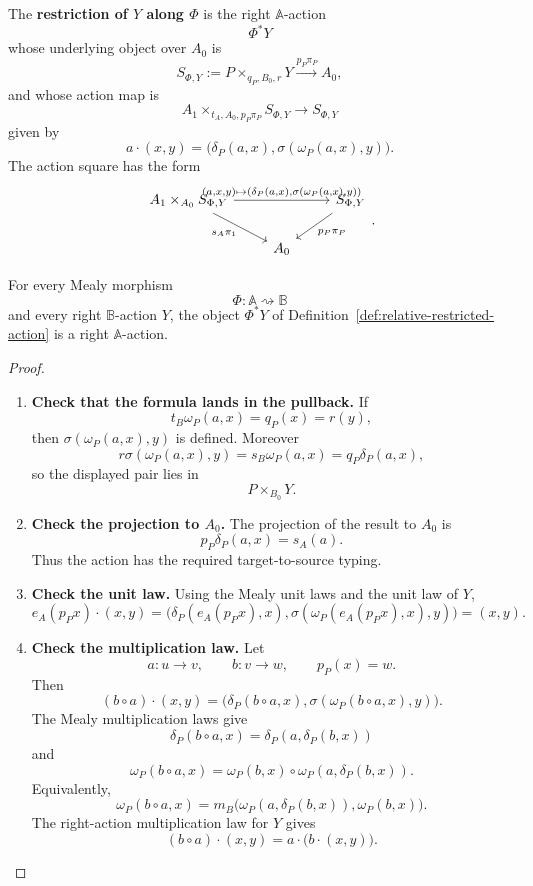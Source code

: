 \begin{definition}
\label{def:relative-restricted-action}
The \textbf{restriction of \(Y\) along \(\Phi\)} is the right
\(\mathbb A\)-action
\[
\Phi^\ast Y
\]
whose underlying object over \(A_0\) is
\[
S_{\Phi,Y}:=
P\times_{q_P,B_0,r}Y
\xrightarrow{p_P\pi_P}
A_0,
\]
and whose action map is
\[
A_1\times_{t_A,A_0,p_P\pi_P}S_{\Phi,Y}
\to S_{\Phi,Y}
\]
given by
\[
a\cdot(x,y)
=
\bigl(
\delta_P(a,x),
\sigma(\omega_P(a,x),y)
\bigr).
\]
The action square has the form
\[
\begin{tikzcd}
A_1\times_{A_0}S_{\Phi,Y}
\arrow[rr,"{(a,x,y)\mapsto(\delta_P(a,x),\sigma(\omega_P(a,x),y))}"]
\arrow[dr,"s_A\pi_1"']
&&
S_{\Phi,Y}
\arrow[dl,"p_P\pi_P"]
\\
& A_0 &
\end{tikzcd}
.
\]
\end{definition}

\begin{theorem}
\label{thm:relative-mealy-restriction-actions}
For every Mealy morphism
\[
\Phi:\mathbb A\rightsquigarrow\mathbb B
\]
and every right \(\mathbb B\)-action \(Y\), the object
\(\Phi^\ast Y\) of Definition~\ref{def:relative-restricted-action} is a right
\(\mathbb A\)-action.
\end{theorem}

\begin{proof}
\leavevmode
\begin{enumerate}
\item \textbf{Check that the formula lands in the pullback.}
If
\[
t_B\omega_P(a,x)=q_P(x)=r(y),
\]
then \(\sigma(\omega_P(a,x),y)\) is defined. Moreover
\[
r\sigma(\omega_P(a,x),y)
=
s_B\omega_P(a,x)
=
q_P\delta_P(a,x),
\]
so the displayed pair lies in
\[
P\times_{B_0}Y.
\]

\item \textbf{Check the projection to \(A_0\).}
The projection of the result to \(A_0\) is
\[
p_P\delta_P(a,x)=s_A(a).
\]
Thus the action has the required target-to-source typing.

\item \textbf{Check the unit law.}
Using the Mealy unit laws and the unit law of \(Y\),
\[
e_A(p_Px)\cdot(x,y)
=
\bigl(
\delta_P(e_A(p_Px),x),
\sigma(\omega_P(e_A(p_Px),x),y)
\bigr)
=
(x,y).
\]

\item \textbf{Check the multiplication law.}
Let
\[
a:u\to v,
\qquad
b:v\to w,
\qquad
p_P(x)=w.
\]
Then
\[
(b\circ a)\cdot(x,y)
=
\bigl(
\delta_P(b\circ a,x),
\sigma(\omega_P(b\circ a,x),y)
\bigr).
\]
The Mealy multiplication laws give
\[
\delta_P(b\circ a,x)
=
\delta_P(a,\delta_P(b,x))
\]
and
\[
\omega_P(b\circ a,x)
=
\omega_P(b,x)\circ\omega_P(a,\delta_P(b,x)).
\]
Equivalently,
\[
\omega_P(b\circ a,x)
=
m_B\bigl(
\omega_P(a,\delta_P(b,x)),
\omega_P(b,x)
\bigr).
\]
The right-action multiplication law for \(Y\) gives
\[
(b\circ a)\cdot(x,y)
=
a\cdot\bigl(b\cdot(x,y)\bigr).
\]
\end{enumerate}
\end{proof}

